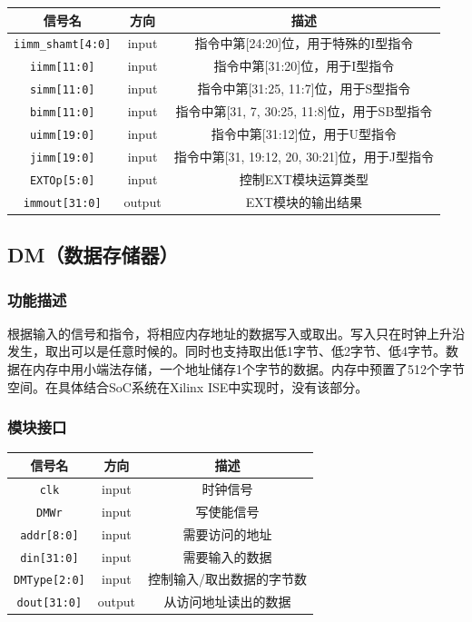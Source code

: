 \documentclass[UTF8,a4paper,autofakebold,15pt]{ctexart}
\begin{document}
\begin{center}
	
	
	\begin{tabular}{|c|c|c|}
		\hline
		信号名&方向&描述\\
		\hline
		{\tt iimm\_shamt[4:0]}&input&指令中第[24:20]位，用于特殊的I型指令\\
		\hline
		{\tt iimm[11:0]}&input&指令中第[31:20]位，用于I型指令\\
		\hline
		{\tt simm[11:0]}&input&指令中第[31:25, 11:7]位，用于S型指令\\
		\hline
		{\tt bimm[11:0]}&input&指令中第[31, 7, 30:25, 11:8]位，用于SB型指令\\
		\hline
		{\tt uimm[19:0]}&input&指令中第[31:12]位，用于U型指令\\
		\hline
		{\tt jimm[19:0]}&input&指令中第[31, 19:12, 20, 30:21]位，用于J型指令\\
		\hline
		{\tt EXTOp[5:0]}&input&控制EXT模块运算类型\\
		\hline
		{\tt immout[31:0]}&output&EXT模块的输出结果\\
		\hline
	\end{tabular}
	
\end{center}

\subsection{DM（数据存储器）}

\subsubsection{功能描述}

根据输入的信号和指令，将相应内存地址的数据写入或取出。写入只在时钟上升沿发生，取出可以是任意时候的。同时也支持取出低1字节、低2字节、低4字节。数据在内存中用小端法存储，一个地址储存1个字节的数据。内存中预置了512个字节空间。在具体结合SoC系统在Xilinx ISE中实现时，没有该部分。

\subsubsection{模块接口}

\begin{center}
	
	
	\begin{tabular}{|c|c|c|}
		\hline
		信号名&方向&描述\\
		\hline
		{\tt clk}&input&时钟信号\\
		\hline
		{\tt DMWr}&input&写使能信号\\
		\hline
		{\tt addr[8:0]}&input&需要访问的地址\\
		\hline
		{\tt din[31:0]}&input&需要输入的数据\\
		\hline
		{\tt DMType[2:0]}&input&控制输入/取出数据的字节数\\
		\hline
		{\tt dout[31:0]}&output&从访问地址读出的数据\\
		\hline
	\end{tabular}

\end{center}
\end{document}
